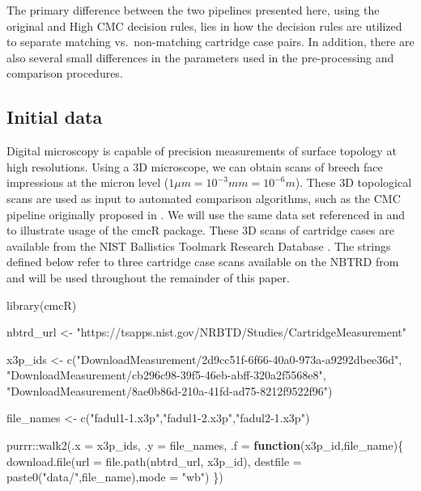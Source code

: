 \documentclass[11pt,]{isuthesis}
\newenvironment{Shaded}{\begin{snugshade}}{\end{snugshade}}
\newcommand{\AttributeTok}[1]{\textcolor[rgb]{0.77,0.63,0.00}{#1}}
\newcommand{\ControlFlowTok}[1]{\textcolor[rgb]{0.13,0.29,0.53}{\textbf{#1}}}
\newcommand{\FunctionTok}[1]{\textcolor[rgb]{0.00,0.00,0.00}{#1}}
\newcommand{\NormalTok}[1]{#1}
\newcommand{\OtherTok}[1]{\textcolor[rgb]{0.56,0.35,0.01}{#1}}
\newcommand{\SpecialCharTok}[1]{\textcolor[rgb]{0.00,0.00,0.00}{#1}}
\newcommand{\StringTok}[1]{\textcolor[rgb]{0.31,0.60,0.02}{#1}}
\begin{document}
The primary difference between the two pipelines presented here, using the original and High CMC decision rules, lies in how the decision rules are utilized to separate matching vs.~non-matching cartridge case pairs.
In addition, there are also several small differences in the parameters used in the pre-processing and comparison procedures.

\hypertarget{initialData}{%
\subsection{Initial data}\label{initialData}}

Digital microscopy is capable of precision measurements of surface topology at high resolutions.
Using a 3D microscope, we can obtain scans of breech face impressions at the micron level (\(1 \mu m = 10^{-3} mm = 10^{-6} m\)).
These 3D topological scans are used as input to automated comparison algorithms, such as the CMC pipeline originally proposed in \citet{song_proposed_2013}.
We will use the same data set referenced in \citet{song_3d_2014} and \citet{tong_improved_2015} to illustrate usage of the cmcR package.
These 3D scans of cartridge cases are available from the NIST Ballistics Toolmark Research Database \citep{nbtrd}.
The strings defined below refer to three cartridge case scans available on the NBTRD from \citet{fadul_empirical_2011} and will be used throughout the remainder of this paper.

\begin{Shaded}
\begin{Highlighting}[]
\FunctionTok{library}\NormalTok{(cmcR)}

\NormalTok{nbtrd\_url }\OtherTok{\textless{}{-}} \StringTok{"https://tsapps.nist.gov/NRBTD/Studies/CartridgeMeasurement"}

\NormalTok{x3p\_ids }\OtherTok{\textless{}{-}} \FunctionTok{c}\NormalTok{(}\StringTok{"DownloadMeasurement/2d9cc51f{-}6f66{-}40a0{-}973a{-}a9292dbee36d"}\NormalTok{,}
             \StringTok{"DownloadMeasurement/cb296c98{-}39f5{-}46eb{-}abff{-}320a2f5568e8"}\NormalTok{,}
             \StringTok{"DownloadMeasurement/8ae0b86d{-}210a{-}41fd{-}ad75{-}8212f9522f96"}\NormalTok{)}

\NormalTok{file\_names }\OtherTok{\textless{}{-}} \FunctionTok{c}\NormalTok{(}\StringTok{"fadul1{-}1.x3p"}\NormalTok{,}\StringTok{"fadul1{-}2.x3p"}\NormalTok{,}\StringTok{"fadul2{-}1.x3p"}\NormalTok{)}

\NormalTok{purrr}\SpecialCharTok{::}\FunctionTok{walk2}\NormalTok{(}\AttributeTok{.x =}\NormalTok{ x3p\_ids,}
             \AttributeTok{.y =}\NormalTok{ file\_names,}
             \AttributeTok{.f =} \ControlFlowTok{function}\NormalTok{(x3p\_id,file\_name)\{}
               \FunctionTok{download.file}\NormalTok{(}\AttributeTok{url =} \FunctionTok{file.path}\NormalTok{(nbtrd\_url, x3p\_id),}
                             \AttributeTok{destfile =} \FunctionTok{paste0}\NormalTok{(}\StringTok{"data/"}\NormalTok{,file\_name),}\AttributeTok{mode =} \StringTok{"wb"}\NormalTok{)}
\NormalTok{             \})}
\end{Highlighting}
\end{Shaded}
\end{document}
